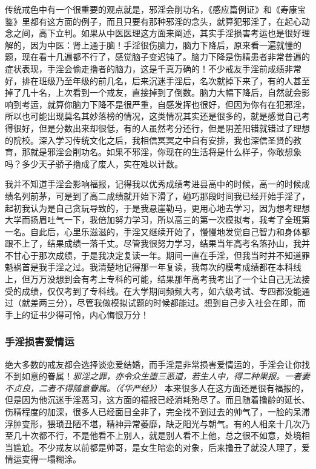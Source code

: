 传统戒色中有一个很重要的观点就是，邪淫会削功名，《感应篇例证》和《寿康宝鉴》里都有这方面的例子，而且只要有那种邪淫的念头，就算犯邪淫了，在起心动念之间，高下立判。如果从中医医理这方面来阐述，其实手淫损害考运也是很好理解的，因为中医：肾上通于脑！手淫很伤脑力，脑力下降后，原来看一遍就懂的题，现在看十几遍都不行了，感觉脑子变迟钝了。脑力下降是伤精患者非常普遍的症状表现，手淫会偷走撸者的脑力，这是千真万确的！不少戒友手淫前成绩非常好，排在班级乃至年级的前几名，后来沉迷手淫后，名次就掉下来了，有的人甚至掉了几十名，上次看到一个戒友，直接掉到了倒数。脑力大幅下降后，自然就会影响到考运，就算你脑力下降不是很严重，自感发挥也很好，但因为你有在犯邪淫，所以也可能出现莫名其妙落榜的情况，这类情况其实还是很多的，就是感觉自己考得很好，但是分数出来却很低，有的人虽然考分还行，但是阴差阳错就错过了理想的院校。深入学习传统文化之后，我相信冥冥之中自有安排，我也深信圣贤的教育，那就是邪淫会削功名。如果不邪淫，你现在的生活将是什么样子，你敢想象吗？多少天子骄子撸成了废人，实在难以计数。

\begin{case}[手淫损害考运]
    我并不知道手淫会影响福报，记得我以优秀成绩考进县高中的时候，高一的时候成绩名列前茅，可是到了高二成绩就开始下滑了，碰巧那段时间我已经开始手淫了，起初我认为是自己贪玩导致的，于是我悬崖勒马，更用心地去学习，因为想考理想大学而扬眉吐气一下，我倍加努力学习，所以高三的第一次模拟考，我考了全班第一名。自此后，心里乐滋滋的，手淫又继续开始了，慢慢地发觉自己智力和身体都跟不上了，结果成绩一落千丈。尽管我很努力学习，结果当年高考名落孙山，我并不甘心于那次成绩，于是我决定复读一年。期间一直在手淫，但我当时并不知道罪魁祸首是我手淫之过。我清楚地记得那一年复读，我每次的模考成绩都在本科线上，但万万没想到会有考上专科的可能，结果那年高考我考出了一个让自己无法接受的成绩，仅仅考到了专科线。在大学期间频频大考，如六级考试、专四都没能通过（就差两三分），尽管我做模拟试题的时候都能过。想到自己步入社会在即，而手上的证书少得可怜，内心悔恨万分！
\end{case}

\subsubsection{手淫损害爱情运}

绝大多数的戒友都会选择谈恋爱结婚，而手淫是非常损害爱情运的，手淫会让你找不到如意的眷属！\textit{邪淫之罪，亦令众生堕三恶道，若生人中，得二种果报。一者妻不贞良，二者不得随意眷属。（《华严经》）} 本来很多人在这方面还是很有福报的，但是因为他沉迷手淫恶习，这方面的福报已经消耗殆尽了。而且随着撸龄的延长、伤精程度的加深，很多人已经面目全非了，完全找不到过去的帅气了，一脸的呆滞浮肿变形，猥琐丑陋不堪，精神异常萎靡，缺乏阳光与朝气。有的人相亲十几次乃至几十次都不行，不是他看不上别人，就是别人看不上他，总之很不如意，处境相当尴尬。不少戒友以前都是帅哥，是女生暗恋的对象，后来撸丑了就没人理了，爱情运变得一塌糊涂。

